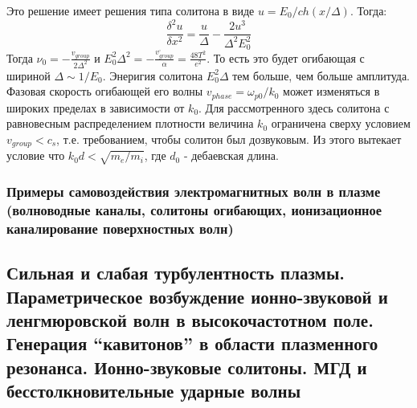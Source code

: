 \documentclass[10pt, a4paper]{article}
\begin{document}
Это решение имеет решения типа солитона в виде $u=E_0/ch(x/\Delta)$. Тогда:
\begin{equation}
	\frac{\delta^2 u}{\delta x^2}= \frac{u}{\Delta} -\frac{2 u^{3}}{\Delta^2 E^2_0} 
\end{equation}
Тогда $\nu_0=-\frac{v_{group}}{2 \Delta^2}$ и $E^2_0 \Delta^2=-\frac{v^{,}_{group}}{\alpha}=\frac{48T^2}{e^2}$. То есть это будет огибающая с шириной $\Delta \sim 1/E_0$. Энеригия солитона $E^2_0 \Delta$ тем больше, чем больше амплитуда.
Фазовая скорость огибающей его волны $v_{phase}=\omega_{p0}/k_0$ может изменяться в широких пределах в зависимости от $k_0$. Для рассмотренного здесь солитона с равновесным распределением плотности величина $k_0$ ограничена сверху условием $v_{group}<c_{s}$, т.е. требованием, чтобы солитон был дозвуковым. Из этого вытекает условие что $k_0 d<\sqrt{m_e/m_i}$, где $d_0$ - дебаевская длина. 


\subsubsection{Примеры самовоздействия электромагнитных волн в плазме (волноводные каналы, солитоны огибающих, ионизационное каналирование поверхностных волн)}

\subsection{Сильная и слабая турбулентность плазмы. Параметрическое возбуждение ионно-звуковой и ленгмюровской волн в высокочастотном поле. Генерация “кавитонов” в области плазменного резонанса. Ионно-звуковые солитоны. МГД и бесстолкновительные ударные волны}
\end{document}
